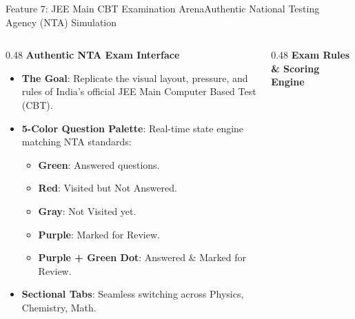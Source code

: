\documentclass[aspectratio=169,10pt]{beamer}
\begin{document}
\begin{frame}[t]{Feature 7: JEE Main CBT Examination Arena}{Authentic National Testing Agency (NTA) Simulation}
  \begin{columns}[t]
    \begin{column}{0.48\textwidth}
      {\fontsize{9.0}{11.0}\selectfont\textbf{\textcolor{KoinexaRed}{Authentic NTA Exam Interface}}}\par\vspace{1.5pt}
      \begin{itemize}\setlength{\itemsep}{1.2pt}
        \item {\fontsize{8.0}{9.8}\selectfont \textbf{The Goal}: Replicate the visual layout, pressure, and rules of India's official JEE Main Computer Based Test (CBT).}
        \item {\fontsize{8.0}{9.8}\selectfont \textbf{5-Color Question Palette}: Real-time state engine matching NTA standards:}
        \begin{itemize}\setlength{\itemsep}{0.8pt}
          \item {\fontsize{7.5}{9.2}\selectfont \textbf{Green}: Answered questions.}
          \item {\fontsize{7.5}{9.2}\selectfont \textbf{Red}: Visited but Not Answered.}
          \item {\fontsize{7.5}{9.2}\selectfont \textbf{Gray}: Not Visited yet.}
          \item {\fontsize{7.5}{9.2}\selectfont \textbf{Purple}: Marked for Review.}
          \item {\fontsize{7.5}{9.2}\selectfont \textbf{Purple + Green Dot}: Answered \& Marked for Review.}
        \end{itemize}
        \item {\fontsize{8.0}{9.8}\selectfont \textbf{Sectional Tabs}: Seamless switching across Physics, Chemistry, Math.}
      \end{itemize}
    \end{column}
    \begin{column}{0.48\textwidth}
      {\fontsize{9.0}{11.0}\selectfont\textbf{\textcolor{KoinexaOrange}{Exam Rules \& Scoring Engine}}}\par\vspace{1.5pt}
      \begin{itemize}\setlength{\itemsep}{1.2pt}

\end{itemize}
\end{column}
\end{columns}
\end{frame}
\end{document}
